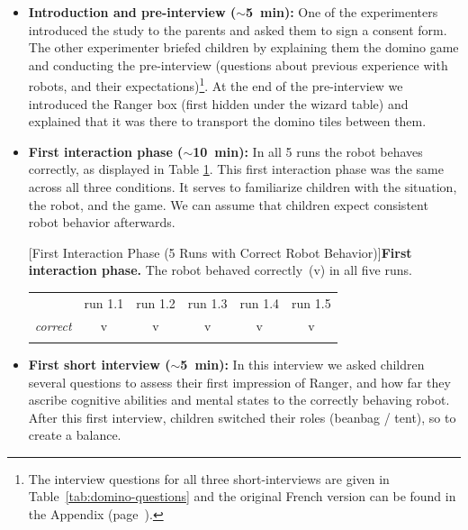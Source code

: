 \documentclass{sig-alternate}
\begin{document}
\begin{itemize}

    \item \textbf{Introduction and pre-interview ($\sim$5~min):} One of the
        experimenters introduced the study to the parents and asked them to sign
        a consent form. The other experimenter briefed children by explaining
        them the domino game and conducting the pre-interview (questions about
        previous experience with robots, and their expectations)\footnote{The
        interview questions for all three short-interviews are given in
        Table~\ref{tab:domino-questions} and the original French version can be
        found in the Appendix (page~\pageref{apx:domino-interview}).}. At the end of the
        pre-interview we introduced the Ranger box (first hidden under the wizard table)
        and explained that it was there to transport the domino tiles between them.

    \item \textbf{First interaction phase ($\sim$10~min):} In all 5 runs the
        robot behaves correctly, as displayed in Table \ref{tab:domino-first}.
        This first interaction phase was the same across all three conditions.
        It serves to familiarize children with the situation, the robot, and the
        game. We can assume that children expect consistent robot behavior
        afterwards.

\begin{table}[H]
[First Interaction Phase (5 Runs with Correct Robot Behavior)]{\small \textbf{First interaction phase.} The robot behaved correctly~(v) in all five runs.}
\label{tab:domino-first}       %
\centering
\footnotesize
\begin{tabular}{lccccc}
\noalign{\smallskip}\noalign{\smallskip}\hline\noalign{\smallskip}
	&  run 1.1 & run 1.2 & run 1.3 & run 1.4 & run 1.5  \\ 
\noalign{\smallskip}\hline\hline
	\textit{correct} & v & v & v & v & v  \\ 
\noalign{\smallskip}\hline
\end{tabular}
\end{table}

    \item \textbf{First short interview ($\sim$5~min):} In this interview we
        asked children several questions to assess their first impression of
        Ranger, and how far they ascribe cognitive abilities and mental states
        to the correctly behaving robot. After this first interview, children
        switched their roles (beanbag / tent), so to create a balance.


\end{itemize}
\end{document}
